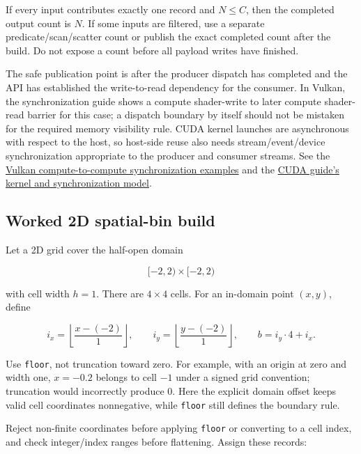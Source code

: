 If every input contributes exactly one record and \(N\le C\), then the completed output count is \(N\). If some inputs are filtered, use a separate predicate/scan/scatter count or publish the exact completed count after the build. Do not expose a count before all payload writes have finished.

The safe publication point is after the producer dispatch has completed and the API has established the write-to-read dependency for the consumer. In Vulkan, the synchronization guide shows a compute shader-write to later compute shader-read barrier for this case; a dispatch boundary by itself should not be mistaken for the required memory visibility rule. CUDA kernel launches are asynchronous with respect to the host, so host-side reuse also needs stream/event/device synchronization appropriate to the producer and consumer streams. See the \href{https://docs.vulkan.org/guide/latest/synchronization_examples.html}{Vulkan compute-to-compute synchronization examples} and the \href{https://docs.nvidia.com/cuda/cuda-programming-guide/02-basics/intro-to-cuda-cpp.html}{CUDA guide's kernel and synchronization model}.

\subsection{Worked 2D spatial-bin build}\label{03-visual-computing-i-ch016-worked-2d-spatial-bin-build}

\hypertarget{03-visual-computing-i-ch016-worked-2d-spatial-bin-build}{}

Let a 2D grid cover the half-open domain

\[
[-2,2)\times[-2,2)
\]

with cell width \(h=1\). There are \(4\times4\) cells. For an in-domain point \((x,y)\), define

\[
i_x=\left\lfloor\frac{x-(-2)}{1}\right\rfloor,
\qquad
i_y=\left\lfloor\frac{y-(-2)}{1}\right\rfloor,
\qquad
b=i_y\cdot4+i_x.
\]

Use \texttt{floor}, not truncation toward zero. For example, with an origin at zero and width one, \(x=-0.2\) belongs to cell \(-1\) under a signed grid convention; truncation would incorrectly produce \(0\). Here the explicit domain offset keeps valid cell coordinates nonnegative, while \texttt{floor} still defines the boundary rule.

Reject non-finite coordinates before applying \texttt{floor} or converting to a cell index, and check integer/index ranges before flattening. Assign these records:

